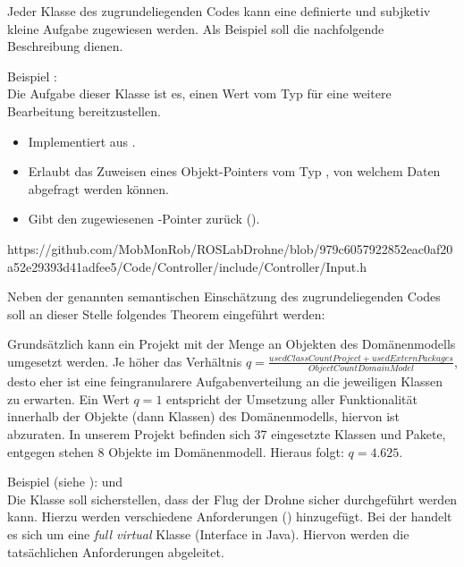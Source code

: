 
Jeder Klasse des zugrundeliegenden Codes kann eine definierte und subjketiv kleine Aufgabe zugewiesen werden. Als Beispiel soll die nachfolgende Beschreibung dienen.

Beispiel :\\
Die Aufgabe dieser Klasse ist es, einen Wert vom Typ  für eine weitere Bearbeitung bereitzustellen.\\
\begin{itemize}
\item Implementiert  aus .
\item Erlaubt das Zuweisen eines Objekt-Pointers vom Typ , von welchem Daten abgefragt werden können.
\item Gibt den zugewiesenen -Pointer zurück ().
\end{itemize}


https://github.com/MobMonRob/ROSLabDrohne/blob/979c6057922852eac0af20a52e29393d41adfee5/Code/Controller/include/Controller/Input.h


Neben der genannten semantischen Einschätzung des zugrundeliegenden Codes soll an dieser Stelle folgendes Theorem eingeführt werden:

Grundsätzlich kann ein Projekt mit der Menge an Objekten des Domänenmodells umgesetzt werden. Je höher das Verhältnis $q =\frac{used ClassCount Project + used Extern Packages}{ObjectCount Domain Model}$, desto eher ist eine feingranularere Aufgabenverteilung an die jeweiligen Klassen zu erwarten. Ein Wert $q=1$ entspricht der Umsetzung aller Funktionalität innerhalb der Objekte (dann Klassen) des Domänenmodells, hiervon ist abzuraten.
In unserem Projekt befinden sich 37 eingesetzte Klassen und Pakete, entgegen stehen 8 Objekte im Domänenmodell. Hieraus folgt: $q = 4.625$.



Beispiel (siehe ):  und \\
Die Klasse  soll sicherstellen, dass der Flug der Drohne sicher durchgeführt werden kann. Hierzu werden verschiedene Anforderungen () hinzugefügt. Bei der  handelt es sich um eine \textit{full virtual} Klasse (Interface in Java). Hiervon werden die tatsächlichen Anforderungen abgeleitet.

